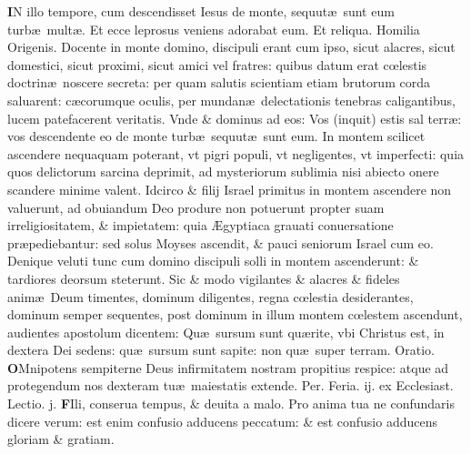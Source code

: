 \documentclass[a5paper,10pt]{book}
\def\leftmarginnote{%
	\lrmarginnote{\hskip -\marginparsep \hskip -6.5em}}
\def\rightmarginnote{%
	\lrmarginnote{\hskip\columnwidth \hskip -1em}}
\def\ae{æ}
\def\AE{Æ}
\def\oe{œ}
\begin{document}
\begin{multicols*}{2}
\vspace{-.25em}
\lettrine[lines=2]{\bfseries \color{red} I}{}N\rightmarginnote{ca. 8.} illo tempore, cum descendisset Iesus de monte, sequut\ae \ sunt eum turb\ae \ mult\ae . Et ecce leprosus veniens adorabat eum.
\newline \color{red} Et reliqua. Homilia Origenis.\color{black}
\newline \color{red} D\color{black}ocente in monte domino, discipuli erant cum ipso, sicut alacres, sicut domestici, sicut proximi, sicut amici vel fratres: quibus datum erat c\oe lestis doctrin\ae \ noscere secreta: per quam salutis scientiam etiam brutorum corda saluarent: c\ae corumque oculis, per mundan\ae \ delectationis tenebras caligantibus, lucem patefacerent veritatis.
Vnde \& dominus ad eos: Vos (inquit) estis sal terr\ae : vos descendente eo de monte turb\ae \ sequut\ae \ sunt eum.
In montem scilicet ascendere nequaquam poterant, vt pigri populi, vt negligentes, vt imperfecti: quia quos delictorum sarcina deprimit, ad mysteriorum sublimia nisi abiecto onere scandere minime valent.
Idcirco \& filij Israel primitus in montem ascendere non valuerunt,
ad obuiandum Deo produre non potuerunt propter suam irreligiositatem, \& impietatem: quia \AE gyptiaca grauati conuersatione pr\ae pediebantur: sed solus Moyses ascendit, \& pauci seniorum Israel cum eo.
Denique veluti tunc cum domino discipuli solli in montem ascenderunt: \& tardiores deorsum steterunt.
Sic \& modo vigilantes \& alacres \& fideles anim\ae \ Deum timentes, dominum diligentes, regna c\oe lestia desiderantes, dominum semper sequentes, post dominum in illum montem c\oe lestem ascendunt, audientes apostolum dicentem: Qu\ae \ sursum sunt qu\ae rite, vbi Christus est, in dextera Dei sedens: qu\ae \ sursum sunt sapite: non qu\ae \ super terram. \color{red} Oratio. \color{black}
\vspace{-1.25em}
\lettrine[lines=2]{\bfseries \color{red} O}{}Mnipotens sempiterne Deus infirmitatem nostram propitius respice: atque ad protegendum nos dexteram tu\ae \ maiestatis extende. Per.
\newline {} \color{red} \hypertarget{MON-SECVNDA-VAGAN}{Feria. ij.} ex Ecclesiast. Lectio. j. \color{black}
\vspace{-.25em}
\lettrine[lines=2]{\bfseries F}{}Ili, conserua\leftmarginnote{\begin{flushright}ca. 4.\end{flushright}} tempus, \& deuita a malo.
Pro anima tua ne confundaris dicere verum: est enim confusio adducens peccatum: \& est confusio adducens gloriam \& gratiam.

\end{multicols*}
\end{document}
